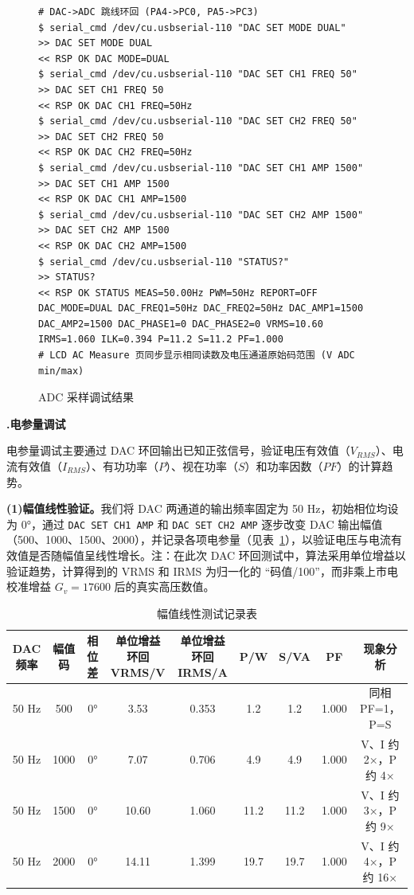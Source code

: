 \documentclass[UTF8,a4paper,zihao=-4,fontset=macnew]{ctexart}
\makeatletter
\def\@extractsubnum#1.#2\@nil{#2}
\newcommand{\subsectiontitle}[2]{%
  \setcounter{subsection}{\numexpr\@extractsubnum#1\@nil-1\relax}\refstepcounter{subsection}%
  \vspace{0.34cm}%
  {\noindent\heiti\bfseries\fontsize{16pt}{18pt}\selectfont #1.\quad #2\par}%
  \vspace{0.54cm}%
}
\makeatother
\begin{document}
\begin{figure}[H]
\centering
\begin{lstlisting}[style=serialterm]
# DAC->ADC 跳线环回 (PA4->PC0, PA5->PC3)
$ serial_cmd /dev/cu.usbserial-110 "DAC SET MODE DUAL"
>> DAC SET MODE DUAL
<< RSP OK DAC MODE=DUAL
$ serial_cmd /dev/cu.usbserial-110 "DAC SET CH1 FREQ 50"
>> DAC SET CH1 FREQ 50
<< RSP OK DAC CH1 FREQ=50Hz
$ serial_cmd /dev/cu.usbserial-110 "DAC SET CH2 FREQ 50"
>> DAC SET CH2 FREQ 50
<< RSP OK DAC CH2 FREQ=50Hz
$ serial_cmd /dev/cu.usbserial-110 "DAC SET CH1 AMP 1500"
>> DAC SET CH1 AMP 1500
<< RSP OK DAC CH1 AMP=1500
$ serial_cmd /dev/cu.usbserial-110 "DAC SET CH2 AMP 1500"
>> DAC SET CH2 AMP 1500
<< RSP OK DAC CH2 AMP=1500
$ serial_cmd /dev/cu.usbserial-110 "STATUS?"
>> STATUS?
<< RSP OK STATUS MEAS=50.00Hz PWM=50Hz REPORT=OFF DAC_MODE=DUAL DAC_FREQ1=50Hz DAC_FREQ2=50Hz DAC_AMP1=1500 DAC_AMP2=1500 DAC_PHASE1=0 DAC_PHASE2=0 VRMS=10.60 IRMS=1.060 ILK=0.394 P=11.2 S=11.2 PF=1.000
# LCD AC Measure 页同步显示相同读数及电压通道原始码范围 (V ADC min/max)
\end{lstlisting}
\caption{ADC 采样调试结果}
\label{fig:debug-adc}
\end{figure}

\subsectiontitle{7.4}{电参量调试}
\label{sec:debug-calculation}

电参量调试主要通过 DAC 环回输出已知正弦信号，验证电压有效值（$V_{RMS}$）、电流有效值（$I_{RMS}$）、有功功率（$P$）、视在功率（$S$）和功率因数（$PF$）的计算趋势。

\textbf{(1)幅值线性验证。}我们将 DAC 两通道的输出频率固定为 50 Hz，初始相位均设为 0°，通过 \texttt{DAC SET CH1 AMP} 和 \texttt{DAC SET CH2 AMP} 逐步改变 DAC 输出幅值（500、1000、1500、2000），并记录各项电参量（见表~\ref{tab:amp-linear}），以验证电压与电流有效值是否随幅值呈线性增长。注：在此次 DAC 环回测试中，算法采用单位增益以验证趋势，计算得到的 VRMS 和 IRMS 为归一化的 “码值/100”，而非乘上市电校准增益 $G_v = 17600$ 后的真实高压数值。

\begin{table}[H]
\centering
{}
\caption{幅值线性测试记录表}
\label{tab:amp-linear}
\setlength{\tabcolsep}{4.5pt}
\begin{tabular}{ccccccccc}
\toprule
DAC 频率 & 幅值码 & 相位差 & \makecell{单位增益\\环回 VRMS/V} & \makecell{单位增益\\环回 IRMS/A} & P/W & S/VA & PF & 现象分析 \\
\midrule
50 Hz & 500 & 0° & 3.53 & 0.353 & 1.2 & 1.2 & 1.000 & 同相 PF=1，P=S \\
50 Hz & 1000 & 0° & 7.07 & 0.706 & 4.9 & 4.9 & 1.000 & V、I 约 2×，P 约 4× \\
50 Hz & 1500 & 0° & 10.60 & 1.060 & 11.2 & 11.2 & 1.000 & V、I 约 3×，P 约 9× \\
50 Hz & 2000 & 0° & 14.11 & 1.399 & 19.7 & 19.7 & 1.000 & V、I 约 4×，P 约 16× \\
\bottomrule
\end{tabular}
\end{table}
\end{document}
